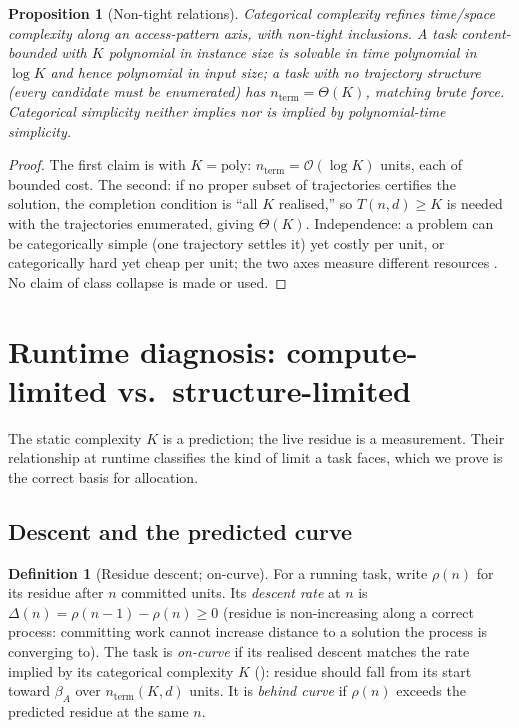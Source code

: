 \documentclass[twocolumn,10pt,a4paper]{article}
\theoremstyle{thmstyle}
\newtheorem{proposition}[theorem]{Proposition}
\theoremstyle{definition}
\newtheorem{definition}[theorem]{Definition}
\theoremstyle{remark}
\newcommand{\floor}{\beta}
\newcommand{\res}{\rho}
\begin{document}
\begin{proposition}[Non-tight relations]
\label{prop:standard}
Categorical complexity refines time/space complexity along an
access-pattern axis, with non-tight inclusions. A task content-bounded
with $K$ polynomial in instance size is solvable in time polynomial in
$\log K$ and hence polynomial in input size; a task with no
trajectory structure (every candidate must be enumerated) has
$n_{\mathrm{term}}=\Theta(K)$, matching brute force. Categorical
simplicity neither implies nor is implied by polynomial-time simplicity.
\end{proposition}

\begin{proof}
The first claim is  with $K=\mathrm{poly}$:
$n_{\mathrm{term}}=\mathcal{O}(\log K)$ units, each of bounded cost. The
second: if no proper subset of trajectories certifies the solution, the
completion condition is ``all $K$ realised,'' so $T(n,d)\ge K$ is needed
with the trajectories enumerated, giving $\Theta(K)$. Independence: a
problem can be categorically simple (one trajectory settles it) yet
costly per unit, or categorically hard yet cheap per unit; the two axes
measure different resources \citep{hartmanis1965,arora2009,sipser2013}.
No claim of class collapse is made or used.
\end{proof}

\section{Runtime diagnosis: compute-limited vs.\ structure-limited}
\label{sec:diagnosis}

The static complexity $K$ is a prediction; the live residue is a
measurement. Their relationship at runtime classifies the kind of limit a
task faces, which we prove is the correct basis for allocation.

\subsection{Descent and the predicted curve}

\begin{definition}[Residue descent; on-curve]
\label{def:descent}
For a running task, write $\res(n)$ for its residue after $n$ committed
units. Its \emph{descent rate} at $n$ is
$\Delta(n)=\res(n-1)-\res(n)\ge 0$ (residue is non-increasing along a
correct process: committing work cannot increase distance to a solution
the process is converging to). The task is \emph{on-curve} if its
realised descent matches the rate implied by its categorical complexity
$K$ (): residue should fall from its start toward
$\floor_A$ over $n_{\mathrm{term}}(K,d)$ units. It is \emph{behind curve}
if $\res(n)$ exceeds the predicted residue at the same $n$.
\end{definition}
\end{document}

